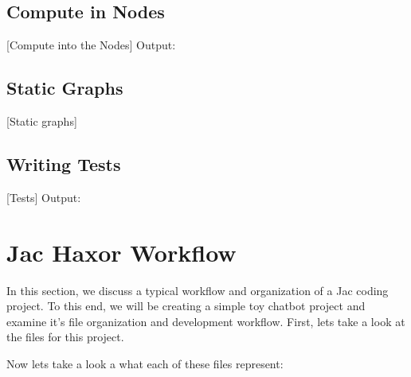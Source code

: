 \subsection{Compute in Nodes}
[Compute into the Nodes]
Output:

\subsection{Static Graphs}
[Static graphs]

\subsection{Writing Tests}
[Tests]
Output:

\section{Jac Haxor Workflow}
In this section, we discuss a typical workflow and organization of a Jac coding project. To this end, we will be creating a simple toy chatbot project and examine it's file organization and development workflow. First, lets take a look at the files for this project.
\par
{}

Now lets take a look a what each of these files represent:

